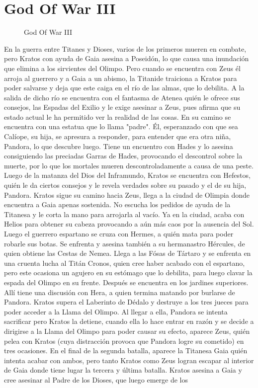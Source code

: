 \section {God Of War III}

\begin{figure}[htbp]
\begin{center}
\caption{God Of War III}
\label{God Of War III}
\end{center}
\end{figure}
En la guerra entre Titanes y Dioses, varios de los primeros mueren en combate, pero Kratos con ayuda de Gaia asesina a Poseidón, lo que causa una inundación que elimina a los sirvientes del Olimpo. Pero cuando se encuentra con Zeus él arroja al guerrero y a Gaia a un abismo, la Titanide traiciona a Kratos para poder salvarse y deja que este caiga en el río de las almas, que lo debilita. A la salida de dicho río se encuentra con el fantasma de Atenea quién le ofrece sus consejos, las Espadas del Exilio y le exige asesinar a Zeus, pues afirma que su estado actual le ha permitido ver la realidad de las cosas. En su camino se encuentra con una estatua que lo llama "padre". Él, esperanzado con que sea Calíope, su hija, se apresura a responder, para entender que era otra niña, Pandora, lo que descubre luego. Tiene un encuentro con Hades y lo asesina consiguiendo las preciadas Garras de Hades, provocando el descontrol sobre la muerte, por lo que los mortales mueren descontroladamente a causa de una peste. Luego de la matanza del Dios del Inframundo, Kratos se encuentra con Hefestos, quién le da ciertos consejos y le revela verdades sobre su pasado y el de su hija, Pandora. Kratos sigue su camino hacia Zeus, llega a la ciudad de Olimpia donde encuentra a Gaia apenas sostenida. No escucha los pedidos de ayuda de la Titanesa y le corta la mano para arrojarla al vacío. Ya en la ciudad, acaba con Helios para obtener su cabeza provocando a aún más caos por la ausencia del Sol. Luego el guerrero espartano se cruza con Hermes, a quién mata para poder robarle sus botas. Se enfrenta y asesina también a su hermanastro Hércules, de quien obtiene las Cestas de Nemea. Llega a las Fósas de Tártaro y se enfrenta en una cruenta lucha al Titán Cronos, quien cree haber acabado con el espartano, pero este ocasiona un agujero en su estómago que lo debilita, para luego clavar la espada del Olimpo en su frente. Después se encuentra en los jardines superiores. Allí tiene una discusión con Hera, a quien termina matando por burlarse de Pandora. Kratos supera el Laberinto de Dédalo y destruye a los tres jueces para poder acceder a la Llama del Olimpo. Al llegar a ella, Pandora se intenta sacrificar pero Kratos la detiene, cuando ella lo hace entrar en razón y se decide a dirigirse a la Llama del Olimpo para poder causar su efecto, aparece Zeus, quién pelea con Kratos (cuya distracción provoca que Pandora logre su cometido) en tres ocasiones. En el final de la segunda batalla, aparece la Titanesa Gaia quién intenta acabar con ambos, pero tanto Kratos como Zeus logran escapar al interior de Gaia donde tiene lugar la tercera y última batalla. Kratos asesina a Gaia y cree asesinar al Padre de los Dioses, que luego emerge de los 